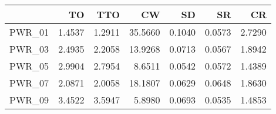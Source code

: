 \begin{tabular}{rrrrrrr}
  \toprule
 & TO & TTO & CW & SD & SR & CR \\ 
  \midrule
PWR\_01 & 1.4537 & 1.2911 & 35.5660 & 0.1040 & 0.0573 & 2.7290 \\ 
  PWR\_03 & 2.4935 & 2.2058 & 13.9268 & 0.0713 & 0.0567 & 1.8942 \\ 
  PWR\_05 & 2.9904 & 2.7954 & 8.6511 & 0.0542 & 0.0572 & 1.4389 \\ 
  PWR\_07 & 2.0871 & 2.0058 & 18.1807 & 0.0629 & 0.0648 & 1.8630 \\ 
  PWR\_09 & 3.4522 & 3.5947 & 5.8980 & 0.0693 & 0.0535 & 1.4853 \\ 
   \bottomrule
\end{tabular}
